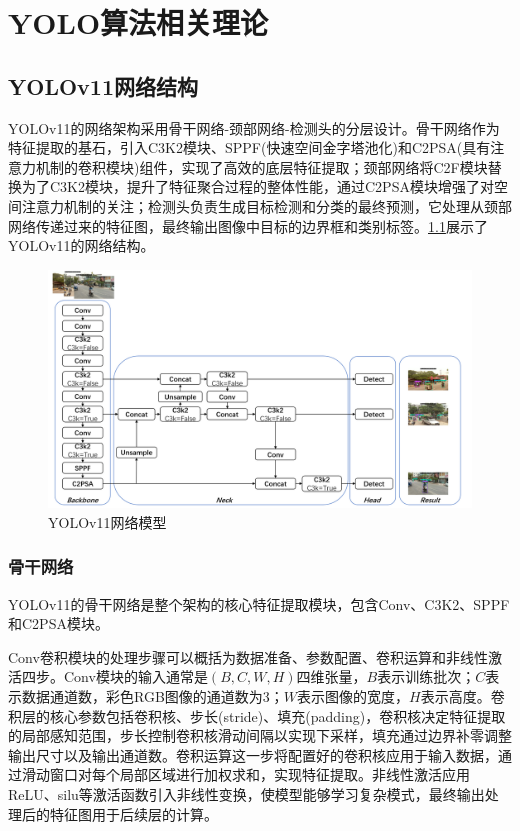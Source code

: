 
\chapter{YOLO算法相关理论}

\section{YOLOv11网络结构}
YOLOv11的网络架构采用骨干网络-颈部网络-检测头的分层设计。骨干网络作为特征提取的基石，引入C3K2模块、SPPF(快速空间金字塔池化)和C2PSA(具有注意力机制的卷积模块)组件，实现了高效的底层特征提取；颈部网络将C2F模块替换为了C3K2模块，提升了特征聚合过程的整体性能，通过C2PSA模块增强了对空间注意力机制的关注；检测头负责生成目标检测和分类的最终预测，它处理从颈部网络传递过来的特征图，最终输出图像中目标的边界框和类别标签。\ref{fig:s}展示了YOLOv11的网络结构。
\begin{figure}[!htb]
  \centering
  \includegraphics[width=1\textwidth]{figs/chap02/yolov11.png}
  \caption{YOLOv11网络模型}
  \label{fig:s}
\end{figure}

\subsection{骨干网络}
YOLOv11的骨干网络是整个架构的核心特征提取模块，包含Conv、C3K2、SPPF和C2PSA模块。

Conv卷积模块的处理步骤可以概括为数据准备、参数配置、卷积运算和非线性激活四步。Conv模块的输入通常是$(B, C, W, H)$四维张量，$B$表示训练批次；$C$表示数据通道数，彩色RGB图像的通道数为3；$W$表示图像的宽度，$H$表示高度。卷积层的核心参数包括卷积核、步长(stride)、填充(padding)，卷积核决定特征提取的局部感知范围，步长控制卷积核滑动间隔以实现下采样，填充通过边界补零调整输出尺寸以及输出通道数。卷积运算这一步将配置好的卷积核应用于输入数据，通过滑动窗口对每个局部区域进行加权求和，实现特征提取。非线性激活应用ReLU、silu等激活函数引入非线性变换，使模型能够学习复杂模式，最终输出处理后的特征图用于后续层的计算。

